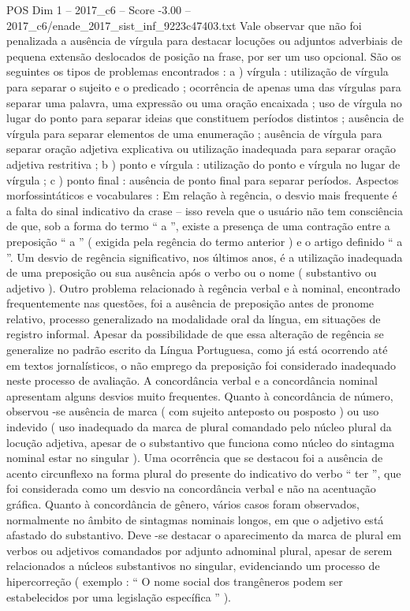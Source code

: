 \begin{textsample}{POS Dim 1 – 2017\_c6 – Score -3.00 – 2017\_c6/enade\_2017\_sist\_inf\_9223c47403.txt}
Vale observar que não foi penalizada a ausência de vírgula para destacar locuções ou adjuntos adverbiais de pequena extensão deslocados de posição na frase, por ser um uso opcional.
São os seguintes os tipos de problemas encontrados : a ) vírgula : utilização de vírgula para separar o sujeito e o predicado ; ocorrência de apenas uma das vírgulas para separar uma palavra, uma expressão ou uma oração encaixada ; uso de vírgula no lugar do ponto para separar ideias que constituem períodos distintos ; ausência de vírgula para separar elementos de uma enumeração ; ausência de vírgula para separar oração adjetiva explicativa ou utilização inadequada para separar oração adjetiva restritiva ; b ) ponto e vírgula : utilização do ponto e vírgula no lugar de vírgula ; c ) ponto final : ausência de ponto final para separar períodos.
Aspectos morfossintáticos e vocabulares : Em relação à regência, o desvio mais frequente é a falta do sinal indicativo da crase – isso revela que o usuário não tem consciência de que, sob a forma do termo “ a ”, existe a presença de uma contração entre a preposição “ a ” ( exigida pela regência do termo anterior ) e o artigo definido “ a ”.
Um desvio de regência significativo, nos últimos anos, é a utilização inadequada de uma preposição ou sua ausência após o verbo ou o nome ( substantivo ou adjetivo ).
Outro problema relacionado à regência verbal e à nominal, encontrado frequentemente nas questões, foi a ausência de preposição antes de pronome relativo, processo generalizado na modalidade oral da língua, em situações de registro informal.
Apesar da possibilidade de que essa alteração de regência se generalize no padrão escrito da Língua Portuguesa, como já está ocorrendo até em textos jornalísticos, o não emprego da preposição foi considerado inadequado neste processo de avaliação.
A concordância verbal e a concordância nominal apresentam alguns desvios muito frequentes.
Quanto à concordância de número, observou -se ausência de marca ( com sujeito anteposto ou posposto ) ou uso indevido ( uso inadequado da marca de plural comandado pelo núcleo plural da locução adjetiva, apesar de o substantivo que funciona como núcleo do sintagma nominal estar no singular ).
Uma ocorrência que se destacou foi a ausência de acento circunflexo na forma plural do presente do indicativo do verbo “ ter ”, que foi considerada como um desvio na concordância verbal e não na acentuação gráfica.
Quanto à concordância de gênero, vários casos foram observados, normalmente no âmbito de sintagmas nominais longos, em que o adjetivo está afastado do substantivo.
Deve -se destacar o aparecimento da marca de plural em verbos ou adjetivos comandados por adjunto adnominal plural, apesar de serem relacionados a núcleos substantivos no singular, evidenciando um processo de hipercorreção ( exemplo : “ O nome social dos trangêneros podem ser estabelecidos por uma legislação específica ” ).

\end{textsample}
